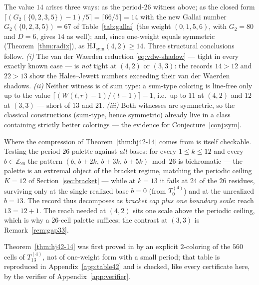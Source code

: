 \documentclass[12pt]{article}
\newcommand{\HJ}{\mathrm{HJ}}
\newcommand{\Wvdw}{W}
\newcommand{\Z}{\mathbb{Z}}
\begin{document}
\begin{remark}\label{rem:records}
The value $14$ arises three ways: as the period-$26$ witness above; as
the closed form $\lceil(G_{2}(\{0,2,3,5\})-1)/5\rceil=\lceil 66/5\rceil=14$
with the new Gallai number $G_{2}(\{0,2,3,5\})=67$ of
Table~\ref{tab:gallai} (the weight $(0,1,5,6)$, with $G_{2}=80$ and
$D=6$, gives $14$ as well); and, since one-weight equals symmetric
(Theorem~\ref{thm:radix}), as $\HJ_{\mathrm{sym}}(4,2)\ge 14$. Three
structural conclusions follow.
\emph{(i)} The van der Waerden reduction \eqref{eq:vdw-shadow} ---
tight in every exactly known case --- is \emph{not} tight at $(4,2)$ or
$(3,3)$: the records $14>12$ and $22>13$ show the Hales--Jewett numbers
exceeding their van der Waerden shadows.
\emph{(ii)} Neither witness is of sum type: a sum-type coloring is
line-free only up to the value $\lceil(\Wvdw(t,r)-1)/(t-1)\rceil-1$,
i.e.\ up to $11$ at $(4,2)$ and $12$ at $(3,3)$ --- short of $13$ and
$21$.
\emph{(iii)} Both witnesses are symmetric, so the classical
constructions (sum-type, hence symmetric) already live in a class
containing strictly better colorings --- the evidence for
Conjecture~\ref{conj:sym}.
\end{remark}

\begin{remark}\label{rem:anatomy}
Where the compression of Theorem~\ref{thm:hj42-14} comes from is itself
checkable. Testing the period-$26$ palette against \emph{all} bases:
for every $1\le k\le 12$ and every $b\in\Z_{26}$ the pattern
$(b,\,b{+}2k,\,b{+}3k,\,b{+}5k)\bmod 26$ is bichromatic --- the palette
is an extremal object of the bracket regime, matching the periodic
ceiling $K=12$ of Section~\ref{sec:bracket} --- while at $k=13$ it
fails at $24$ of the $26$ residues, surviving only at the single
realized base $b=0$ (from $T_{0}^{(4)}$) and at the unrealized $b=13$.
The record thus decomposes as \emph{bracket cap plus one boundary
scale}: reach $13=12+1$. The reach needed at $(4,2)$ sits one scale
above the periodic ceiling, which is why a $26$-cell palette suffices;
the contrast at $(3,3)$ is Remark~\ref{rem:gap33}.
\end{remark}

\begin{remark}
Theorem~\ref{thm:hj42-14} was first proved in \cite{mh} by an explicit
$2$-coloring of the $560$ cells of $T_{13}^{(4)}$, not of one-weight
form with a small period; that table is reproduced in
Appendix~\ref{app:table42} and is checked, like every certificate here,
by the verifier of Appendix~\ref{app:verifier}.
\end{remark}
\end{document}
